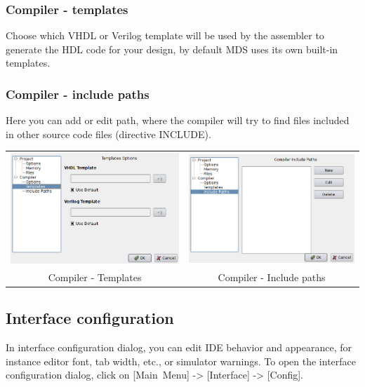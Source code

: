         \subsubsection{Compiler - templates}
            Choose which VHDL or Verilog template will be used by the assembler to generate the HDL code for your
            design, by default MDS uses its own built-in templates.

        \subsubsection{Compiler - include paths}
            Here you can add or edit path, where the compiler will try to find files included in other source code files
            (directive INCLUDE).

        \begin{table}[h!]
            \begin{tabular}{cc}
                \includegraphics[width=.5\textwidth]{img/config5.png}
                    &
                \includegraphics[width=.5\textwidth]{img/config6.png}
                    \\
                Compiler - Templates & Compiler - Include paths
            \end{tabular}
            \end{table}

\subsection{Interface configuration}
    In interface configuration dialog, you can edit IDE behavior and appearance, for instance editor font, tab width,
    etc., or simulator warnings. To open the interface configuration dialog, click on [Main~Menu] -> [Interface] ->
    [Config].

